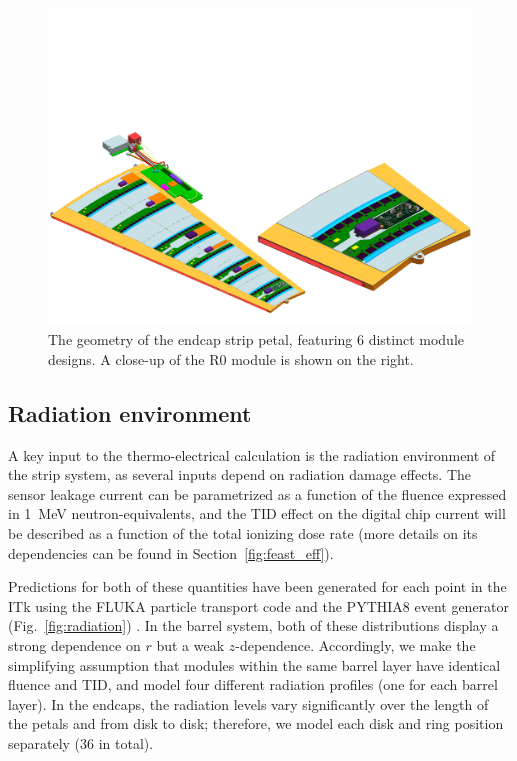 \begin{figure}[ht]
\centering
\includegraphics[width=0.8\linewidth]{figures/petal_and_closeup.pdf}
\caption{The geometry of the endcap strip petal, featuring 6 distinct module designs. A close-up of the R0 module is shown on the right.}
\label{fig:endcapgeometry}
\end{figure}

\subsection{Radiation environment}
A key input to the thermo-electrical calculation is the radiation environment of the strip system, as several inputs depend on radiation damage effects. The sensor leakage current can be parametrized as  a function of the fluence expressed in 1~MeV neutron-equivalents, and the TID effect on the digital chip current will be described as a function of the total ionizing dose rate (more details on its dependencies can be found in Section~\ref{fig:feast_eff}). 

Predictions for both of these quantities have been generated for each point in the ITk using the FLUKA particle transport code and the PYTHIA8 event generator (Fig.~\ref{fig:radiation}) \cite{background}. In the barrel system, both of these distributions display a strong dependence on $r$ but a weak $z$-dependence. Accordingly, we make the simplifying assumption that modules within the same barrel layer have identical fluence and TID, and model four different radiation profiles (one for each barrel layer). In the endcaps, the radiation levels vary significantly over the length of the petals and from disk to disk; therefore, we model each disk and ring position separately (36 in total).

